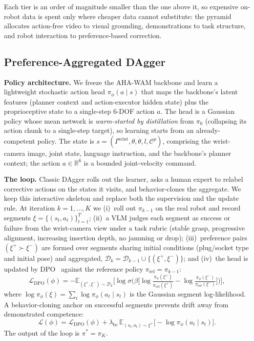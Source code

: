 \documentclass[letterpaper, 10pt, conference]{ieeeconf}
\begin{document}
Each tier is an order of magnitude smaller than the one above it, so expensive on-robot data is spent only where cheaper data cannot substitute: the pyramid allocates action-free video to visual grounding, demonstrations to task structure, and robot interaction to preference-based correction.

\subsection{Preference-Aggregated DAgger}
\label{subsec:dagger}

\textbf{Policy architecture.} We freeze the AHA-WAM backbone and learn a lightweight stochastic action head $\pi_\phi(a\mid s)$ that maps the backbone's latent features (planner context and action-executor hidden state) plus the proprioceptive state to a single-step 6-DOF action $a$. The head is a Gaussian policy whose mean network is \emph{warm-started by distillation} from $\pi_0$ (collapsing its action chunk to a single-step target), so learning starts from an already-competent policy. The state is $s=(I^{\text{wrist}}, \theta, \dot\theta, l, \mathcal{C}^{p})$, comprising the wrist-camera image, joint state, language instruction, and the backbone's planner context; the action $a\in\mathbb{R}^6$ is a bounded joint-velocity command.

\textbf{The loop.} Classic DAgger rolls out the learner, asks a human expert to relabel corrective actions on the states it visits, and behavior-clones the aggregate. We keep this interactive skeleton and replace both the supervision and the update rule. At iteration $k{=}1,\dots,K$ we (i)~roll out $\pi_{k-1}$ on the real robot and record segments $\xi=\{(s_t,a_t)\}_{t=1}^{T}$; (ii)~a VLM judges each segment as success or failure from the wrist-camera view under a task rubric (stable grasp, progressive alignment, increasing insertion depth, no jamming or drop); (iii)~preference pairs $(\xi^{+}\succ\xi^{-})$ are formed over segments sharing initial conditions (plug/socket type and initial pose) and aggregated, $\mathcal{D}_k=\mathcal{D}_{k-1}\cup\{(\xi^{+},\xi^{-})\}$; and (iv)~the head is updated by DPO~\cite{rafailov2023dpo} against the reference policy $\pi_{\text{ref}}=\pi_{k-1}$:
\begin{equation}
\mathcal{L}_{\text{DPO}}(\phi) = -\mathbb{E}_{(\xi^{+},\xi^{-})\sim\mathcal{D}_k}\Big[\log\sigma\Big(\beta\big[\log\tfrac{\pi_\phi(\xi^{+})}{\pi_{\text{ref}}(\xi^{+})}-\log\tfrac{\pi_\phi(\xi^{-})}{\pi_{\text{ref}}(\xi^{-})}\big]\Big)\Big],
\label{eq:dpo}
\end{equation}
where $\log\pi_\phi(\xi)=\sum_{t}\log\pi_\phi(a_t\mid s_t)$ is the Gaussian segment log-likelihood. A behavior-cloning anchor on successful segments prevents drift away from demonstrated competence:
\begin{equation}
\mathcal{L}(\phi) = \mathcal{L}_{\text{DPO}}(\phi) + \lambda_{\text{bc}}\,\mathbb{E}_{(s_t,a_t)\sim\xi^{+}}\big[-\log\pi_\phi(a_t\mid s_t)\big].
\label{eq:total}
\end{equation}
The output of the loop is $\pi^{*}=\pi_K$.
\end{document}
